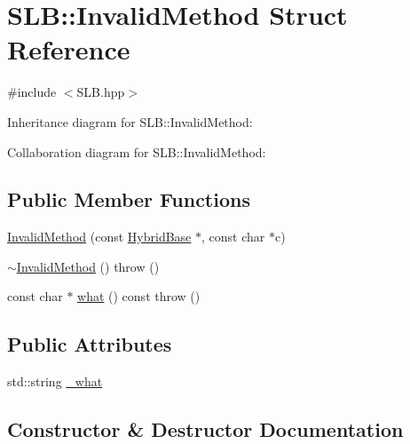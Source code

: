 \hypertarget{structSLB_1_1InvalidMethod}{}\section{S\+LB\+:\+:Invalid\+Method Struct Reference}
\label{structSLB_1_1InvalidMethod}


{\ttfamily \#include $<$S\+L\+B.\+hpp$>$}



Inheritance diagram for S\+LB\+:\+:Invalid\+Method\+:


Collaboration diagram for S\+LB\+:\+:Invalid\+Method\+:
\subsection*{Public Member Functions}
\begin{DoxyCompactItemize}
\item 
\hyperlink{structSLB_1_1InvalidMethod_ae5881b956e71d38eb05c4eb4a5bac760}{Invalid\+Method} (const \hyperlink{classSLB_1_1HybridBase}{Hybrid\+Base} $\ast$, const char $\ast$c)
\item 
\hyperlink{structSLB_1_1InvalidMethod_af1fb0ef592bde3f32c69b24e71c33b85}{$\sim$\+Invalid\+Method} ()  throw ()
\item 
const char $\ast$ \hyperlink{structSLB_1_1InvalidMethod_a3f8f6e40a6bfe47b8483ba5fcdbdf7a9}{what} () const   throw ()
\end{DoxyCompactItemize}
\subsection*{Public Attributes}
\begin{DoxyCompactItemize}
\item 
std\+::string \hyperlink{structSLB_1_1InvalidMethod_a3fa9d85d93755ecf551aae9daf8a971d}{\+\_\+what}
\end{DoxyCompactItemize}


\subsection{Constructor \& Destructor Documentation}
